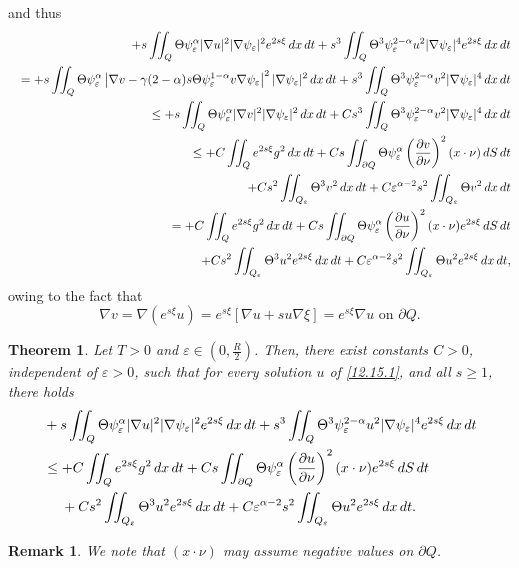 \documentclass[11pt]{article}
\newtheorem{remark}{Remark}[section]
\newtheorem{theorem}{Theorem}[section]
\numberwithin{equation}{section}
\begin{document}
and thus
\begin{eqnarray*}
&&+s\iint_Q\Theta \psi_\varepsilon^\alpha |\nabla u|^2|\nabla \psi_\varepsilon|^2 e^{2s\xi}\,dx\,dt + s^3\iint_Q \Theta^3 \psi_\varepsilon^{2-\alpha}u^2|\nabla\psi_\varepsilon|^4e^{2s\xi}\,dx\,dt \\
&&= +s\iint_Q\Theta\psi_\varepsilon^\alpha \left|\nabla v - \gamma(2-\alpha)s\Theta \psi_\varepsilon^{1-\alpha}v\nabla\psi_\varepsilon\right|^2|\nabla\psi_\varepsilon|^2\,dx\,dt + s^3\iint_Q\Theta^3\psi_\varepsilon^{2-\alpha}v^2|\nabla\psi_\varepsilon|^4\,dx\,dt \\
&&\leq +s\iint_Q\Theta \psi_\varepsilon^\alpha |\nabla v|^2|\nabla \psi_\varepsilon|^2\,dx\,dt + Cs^3\iint_Q \Theta^3 \psi_\varepsilon^{2-\alpha}v^2|\nabla \psi_\varepsilon|^4\,dx\,dt \\
&&\leq +C\iint_Q e^{2s\xi}g^2\,dx\,dt + Cs\iint_{\partial Q}\Theta \psi_\varepsilon^\alpha \left(\frac{\partial v}{\partial \nu}\right)^2(x\cdot\nu)\,dS\,dt \\
&&\hspace{4.5mm} + Cs^2\iint_{Q_\varepsilon}\Theta^3 v^2\,dx\,dt + C\varepsilon^{\alpha-2}s^2\iint_{Q_\varepsilon}\Theta v^2\,dx\,dt \\
&&= +C\iint_Q e^{2s\xi}g^2\,dx\,dt + Cs\iint_{\partial Q}\Theta \psi_\varepsilon^\alpha \left(\frac{\partial u}{\partial \nu}\right)^2(x\cdot\nu)e^{2s\xi}\,dS\,dt \\
&&\hspace{4.5mm} + Cs^2\iint_{Q_\varepsilon}\Theta^3 u^2e^{2s\xi}\,dx\,dt + C\varepsilon^{\alpha-2}s^2\iint_{Q_\varepsilon}\Theta u^2e^{2s\xi}\,dx\,dt,
\end{eqnarray*}
owing to the fact that
\begin{equation*}
\nabla v = \nabla (e^{s\xi}u) = e^{s\xi}\left[\nabla u + su\nabla \xi\right] = e^{s\xi}\nabla u \text{  on } \partial Q.
\end{equation*}
\begin{theorem}\label{12.21.T1}
Let $T > 0$ and $\varepsilon \in (0, \frac{R}{2})$. Then, there exist constants $C > 0$, independent of $\varepsilon > 0$, such that for every solution $u$ of \eqref{12.15.1},  and all  $s \geq 1$, there holds
\begin{equation*}
\begin{split}
&+s\iint_Q\Theta \psi_\varepsilon^\alpha |\nabla u|^2|\nabla \psi_\varepsilon|^2 e^{2s\xi}\,dx\,dt + s^3\iint_Q \Theta^3 \psi_\varepsilon^{2-\alpha}u^2|\nabla\psi_\varepsilon|^4e^{2s\xi}\,dx\,dt \\
&\leq +C\iint_Q e^{2s\xi}g^2\,dx\,dt + Cs\iint_{\partial Q}\Theta \psi_\varepsilon^\alpha \left(\frac{\partial u}{\partial \nu}\right)^2(x\cdot\nu)e^{2s\xi}\,dS\,dt \\
&\hspace{4.5mm} + Cs^2\iint_{Q_\varepsilon}\Theta^3 u^2 e^{2s\xi}\,dx\,dt + C\varepsilon^{\alpha-2}s^2\iint_{Q_\varepsilon}\Theta u^2e^{2s\xi}\,dx\,dt.
\end{split}
\end{equation*}
\end{theorem}
\begin{remark}
We note that $(x\cdot \nu)$ may assume negative values on $\partial Q$.
\end{remark}
\end{document}
